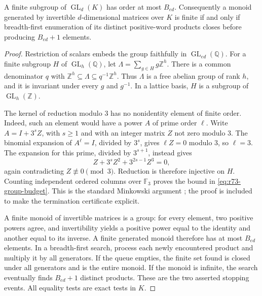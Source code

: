 \begin{lemma}\label{lem:r73-minkowski}
A finite subgroup of $\operatorname{GL}_d(K)$ has order at most $B_{ed}$.
Consequently a monoid generated by invertible $d$-dimensional matrices over
$K$ is finite if and only if breadth-first enumeration of its distinct
positive-word products closes before producing $B_{ed}+1$ elements.
\end{lemma}
\begin{proof}
Restriction of scalars embeds the group faithfully in
$\operatorname{GL}_{ed}(\mathbb Q)$. For a finite subgroup $H$ of
$\operatorname{GL}_h(\mathbb Q)$, let
$\Lambda=\sum_{g\in H}g\mathbb Z^h$. There is a common denominator $q$
with $\mathbb Z^h\subseteq\Lambda\subseteq q^{-1}\mathbb Z^h$.
Thus $\Lambda$ is a free abelian group of rank $h$, and it is invariant
under every $g$ and $g^{-1}$. In a lattice basis, $H$ is a subgroup of
$\operatorname{GL}_h(\mathbb Z)$.

The kernel of reduction modulo $3$ has no nonidentity element of finite
order. Indeed, such an element would have a power $A$ of prime order
$\ell$. Write $A=I+3^s Z$, with $s\ge1$ and with an integer matrix $Z$
not zero modulo $3$. The binomial expansion of $A^\ell=I$, divided by
$3^s$, gives $\ell Z=0$ modulo $3$, so $\ell=3$. The expansion for this
prime, divided by $3^{s+1}$, instead gives
\[
 Z+3^sZ^2+3^{2s-1}Z^3=0,
\]
again contradicting $Z\not\equiv0\pmod3$. Reduction is therefore
injective on $H$. Counting independent ordered columns over $\mathbb F_3$
proves the bound in \eqref{eq:r73-group-budget}. This is the standard
Minkowski argument \cite{Serre07}; the proof is included to make the
termination certificate explicit.

A finite monoid of invertible matrices is a group: for every element,
two positive powers agree, and invertibility yields a positive power
equal to the identity and another equal to its inverse. A finite generated
monoid therefore has at most $B_{ed}$ elements. In a breadth-first search,
process each newly encountered product and multiply it by all generators.
If the queue empties, the finite set found is closed under all generators
and is the entire monoid. If the monoid is infinite, the search eventually
finds $B_{ed}+1$ distinct products. These are the two asserted stopping
events. All equality tests are exact tests in $K$.
\end{proof}

